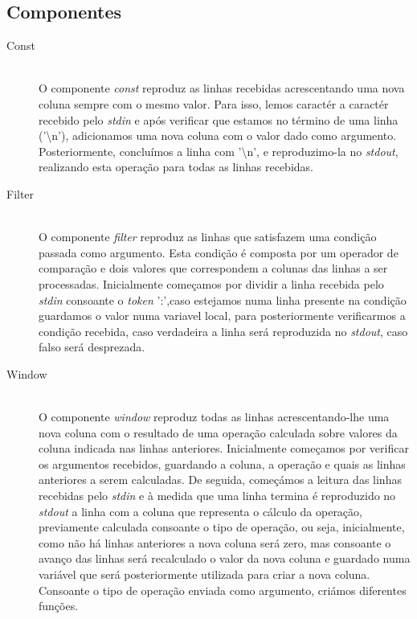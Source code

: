 \documentclass[12pt]{article}
\begin{document}
\subsection{Componentes} 
\begin{description} 
\item[Const] \hfill \\
O componente \textit{const} reproduz as linhas recebidas acrescentando uma nova coluna sempre com o mesmo valor. Para isso, lemos caractér a caractér recebido pelo \textit{stdin} e após verificar que estamos no término de uma linha ('\textbackslash n'), adicionamos uma nova coluna com o valor dado como argumento. Posteriormente, concluímos a linha com '\textbackslash n', e reproduzimo-la no \textit{stdout}, realizando esta operação para todas as linhas recebidas. 

\item[Filter] \hfill \\
O componente \textit{filter} reproduz as linhas que satisfazem uma condição passada como argumento. Esta condição é composta por um operador de comparação e dois valores que correspondem a colunas das linhas a ser processadas. Inicialmente começamos por dividir a linha recebida pelo \textit{stdin} consoante o \textit{token} ':',caso estejamos numa linha presente na condição guardamos o valor numa variavel local, para posteriormente verificarmos a condição recebida, caso verdadeira a linha será reproduzida no \textit{stdout}, caso falso será desprezada.

\item[Window] \hfill \\
O componente \textit{window} reproduz todas as linhas acrescentando-lhe uma nova coluna com o resultado de uma operação calculada sobre valores da coluna indicada nas linhas anteriores. Inicialmente começamos por verificar os argumentos recebidos, guardando a coluna, a operação e quais as linhas anteriores a serem calculadas. De seguida, começámos a leitura das linhas recebidas pelo \textit{stdin} e à medida que uma linha termina é reproduzido no \textit{stdout} a linha com a coluna que representa o cálculo da operação, previamente calculada consoante o tipo de operação, ou seja, inicialmente, como não há linhas anteriores a nova coluna será zero, mas consoante o avanço das linhas será recalculado o valor da nova coluna e guardado numa variável que será posteriormente utilizada para criar a nova coluna. Consoante o tipo de operação enviada como argumento, criámos diferentes funções.


\end{description}
\end{document}

